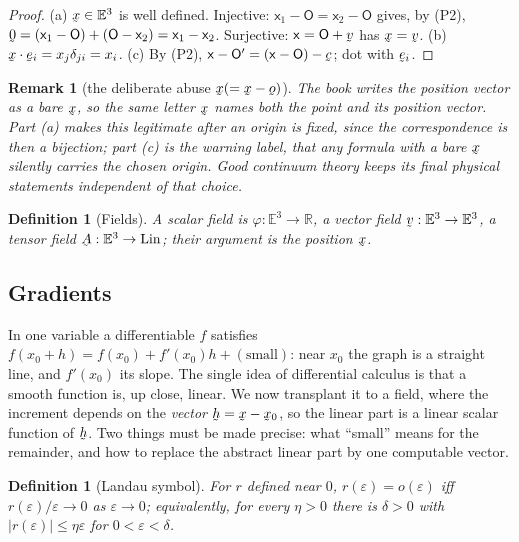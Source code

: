 \documentclass[17pt,a4paper]{extreport}
\DeclareRobustCommand{\vek}[1]{\underaccent{\tilde}{#1}}
\newcommand{\Rn}{\mathbb{R}}
\newcommand{\Et}{\mathbb{E}^{3}}
\newcommand{\Lin}{\operatorname{Lin}}
\newcommand{\bc}{\vek{c}}
\newcommand{\bh}{\vek{h}}
\newcommand{\bv}{\vek{v}}
\newcommand{\bx}{\vek{x}}
\newcommand{\bo}{\vek{o}}
\newcommand{\be}{\vek{e}}
\newcommand{\bze}{\vek{0}}
\newcommand{\bA}{\vek{A}}
\newcommand{\dd}{\delta}
\newcommand{\eps}{\varepsilon}
\newcommand{\ip}[2]{#1\cdot#2}
\theoremstyle{scplain}
\theoremstyle{scdefn}
\newtheorem{definition}[theorem]{Definition}
\newtheorem{remark}[theorem]{Remark}
\theoremstyle{scplain}
\begin{document}
\begin{proof}
(a) $\bx\in\Et$ is well defined. Injective: $\mathsf{x}_1-\mathsf{O}
=\mathsf{x}_2-\mathsf{O}$ gives, by (P2),
$\bze=(\mathsf{x}_1-\mathsf{O})+(\mathsf{O}-\mathsf{x}_2)
=\mathsf{x}_1-\mathsf{x}_2$. Surjective: $\mathsf{x}=\mathsf{O}+\bv$ has
$\bx=\bv$. (b) $\ip\bx{\be_i}=x_j\dd_{ji}=x_i$. (c) By (P2),
$\mathsf{x}-\mathsf{O}'=(\mathsf{x}-\mathsf{O})-\bc$; dot with $\be_i$.
\end{proof}

\begin{remark}[the deliberate abuse $\bx(=\bx-\bo)$]\label{rem:abuse}
The book writes the position vector as a bare $\bx$, so the same letter
$\bx$ names both the point and its position vector. Part (a) makes this
legitimate \emph{after} an origin is fixed, since the correspondence is
then a bijection; part (c) is the warning label, that any formula with a
bare $\bx$ silently carries the chosen origin. Good continuum theory keeps
its final physical statements independent of that choice.
\end{remark}

\begin{definition}[Fields]\label{def:field}
A scalar field is $\varphi:\Et\to\Rn$, a vector field $\bv:\Et\to\Et$, a
tensor field $\bA:\Et\to\Lin$; their argument is the position $\bx$.
\end{definition}

\subsection{Gradients}\label{ss:grad}

In one variable a differentiable $f$ satisfies
$f(x_0+h)=f(x_0)+f'(x_0)h+(\text{small})$: near $x_0$ the graph is a
straight line, and $f'(x_0)$ its slope. The single idea of differential
calculus is that a smooth function is, up close, linear. We now transplant
it to a field, where the increment depends on the \emph{vector}
$\bh=\bx-\bx_0$, so the linear part is a linear scalar function of $\bh$.
Two things must be made precise: what ``small'' means for the remainder,
and how to replace the abstract linear part by one computable vector.

\begin{definition}[Landau symbol]\label{def:landau}
For $r$ defined near $0$, $r(\eps)=o(\eps)$ iff $r(\eps)/\eps\to0$ as
$\eps\to0$; equivalently, for every $\eta>0$ there is $\dd>0$ with
$|r(\eps)|\le\eta\eps$ for $0<\eps<\dd$.
\end{definition}
\end{document}
